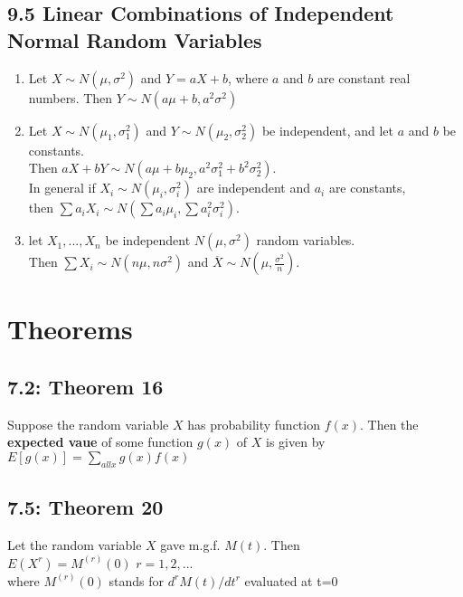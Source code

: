 \documentclass[11pt]{article}
\begin{document}
		\subsection*{9.5 Linear Combinations of Independent Normal Random Variables}
		\begin{enumerate}
			\item Let $X\sim N(\mu,\sigma^2)$ and $Y = aX+b$, where $a$ and $b$ are constant real numbers. Then $Y\sim N(a\mu + b,a^2\sigma^2)$
			
			\item Let $X\sim N(\mu_1,\sigma^2_1)$ and $Y\sim N(\mu_2,\sigma^2_2)$ be independent, and let $a$ and $b$ be constants. \\
			Then $aX+bY \sim N(a\mu+b\mu_2,a^2\sigma_1^2+b^2\sigma_2^2)$.\\
			In general if $X_i \sim N(\mu_i,\sigma^2_i)$ are independent and $a_i$ are constants,\\
			then $\sum a_iX_i \sim
			 N(\sum a_i\mu_i,\sum a_i^2\sigma_i^2)$.
			 
			 \item let $X_1,...,X_n$ be independent $N(\mu,\sigma^2)$ random variables.\\
			 Then $\sum X_i\sim N(n \mu,n\sigma^2)$ and $\overline{X}\sim N(\mu,\frac{\sigma^2}{n})$.
		\end{enumerate}
		

			
\section*{Theorems}
	\subsection*{7.2: Theorem 16}
		Suppose the random variable $X$ has probability function $f(x)$. Then the {\bf expected vaue} of some function $g(x)$ of $X$ is given by\\
		$E[g(x)]=\sum_{all x}g(x)f(x)$
	\subsection*{7.5: Theorem 20}
		Let the random variable $X$ gave m.g.f. $M(t)$. Then\\
		$ E(X^r)=M^{(r)}(0)$   $r=1,2,...$\\
		where $M^{(r)}(0)$ stands for $d^rM(t)/dt^r$ evaluated at t=0\\
		
\end{document}
